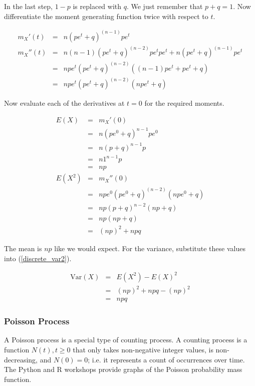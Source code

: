 \documentclass[]{article}
\begin{document}
In the last step, $1-p$ is replaced with $q$.  We just
remember that $p + q = 1$.  Now
differentiate the moment generating function twice with
respect to $t$.

\begin{eqnarray*}
m_X'(t) & = & n(pe^t + q)^{(n-1)} pe^t \\
m_X''(t) & = & n(n-1)(pe^t + q)^{(n-2)} pe^t pe^t +
          n(pe^t + q)^{(n-1)} pe^t \\
   & = & npe^t(pe^t + q)^{(n-2)}((n-1)pe^t + pe^t + q) \\
   & = & npe^t(pe^t + q)^{(n-2)}(npe^t + q)
\end{eqnarray*}

Now evaluate each of the derivatives at $t=0$ for the
required moments.

\begin{eqnarray*}
E(X) & = & m_X'(0) \\
   & = & n(pe^0 + q)^{n-1} pe^0 \\
   & = & n(p+q)^{n-1}p \\
   & = & n1^{n-1}p \\
   & = & np  \\
E(X^2) & = & m_X''(0) \\
   & = & npe^0(pe^0 + q)^{(n-2)}(npe^0 + q) \\
   & = & np(p+q)^{n-2} (np + q) \\
   & = & np (np+q) \\
   & = & (np)^2 + npq
\end{eqnarray*}

The mean is $np$ like we would expect.  For the variance,
substitute these values into (\ref{discrete_var2}).

\begin{eqnarray}
\mbox{Var}(X) & = & E(X^2) - E(X)^2 \nonumber \\
   & = & (np)^2 + npq - (np)^2 \nonumber \\
   & = & npq \label{binomial_var}
\end{eqnarray}

\subsubsection{Poisson Process}

A Poisson process is a special type of counting process.
A counting process is a function $N(t), t \ge 0$ that
only takes non-negative integer values, is non-decreasing,
and $N(0)=0$;
i.e. it represents a count of occurrences over time.  The
Python and R workshops provide graphs of the Poisson
probability mass function.
\end{document}
